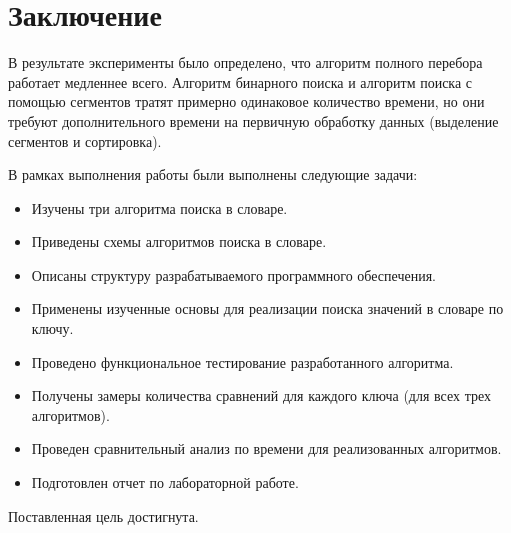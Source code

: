 \chapter*{Заключение}

В результате эксперименты было определено, что алгоритм полного перебора работает медленнее всего. Алгоритм бинарного поиска и алгоритм поиска с помощью сегментов тратят примерно одинаковое количество времени, но они требуют дополнительного времени на первичную обработку данных (выделение сегментов и сортировка).


В рамках выполнения работы были выполнены следующие задачи:
\begin{itemize}
	\item Изучены три алгоритма поиска в словаре.
	\item Приведены схемы алгоритмов поиска в словаре.
	\item Описаны структуру разрабатываемого программного обеспечения.
	\item Применены изученные основы для реализации поиска значений в словаре по ключу.
	\item Проведено функциональное тестирование разработанного алгоритма.
	\item Получены замеры количества сравнений для каждого ключа (для всех трех алгоритмов).
	\item Проведен сравнительный анализ по времени для реализованных алгоритмов.
	\item Подготовлен отчет по лабораторной работе.
\end{itemize}


Поставленная цель достигнута.

